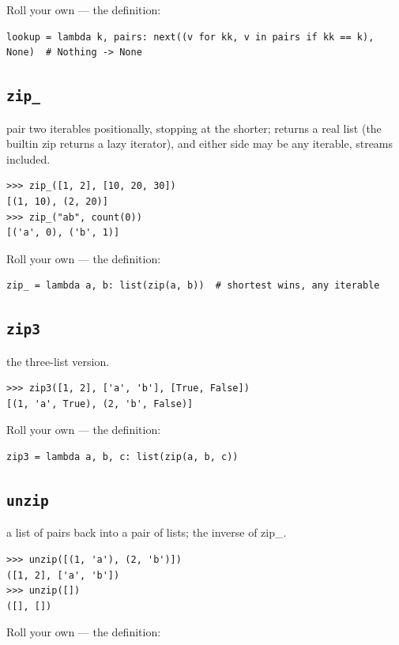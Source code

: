\documentclass[10pt,letterpaper]{book}
\begin{document}
Roll your own --- the definition:

\begin{lstlisting}[style=ex]
lookup = lambda k, pairs: next((v for kk, v in pairs if kk == k), None)  # Nothing -> None
\end{lstlisting}
\subsection{\texttt{zip\_}}\label{def:zip-}
pair two iterables positionally, stopping at the shorter; returns a real list (the builtin zip returns a lazy iterator), and either side may be any iterable, streams included.
\begin{lstlisting}[style=ex]
>>> zip_([1, 2], [10, 20, 30])
[(1, 10), (2, 20)]
>>> zip_("ab", count(0))
[('a', 0), ('b', 1)]
\end{lstlisting}

Roll your own --- the definition:

\begin{lstlisting}[style=ex]
zip_ = lambda a, b: list(zip(a, b))  # shortest wins, any iterable
\end{lstlisting}

\subsection{\texttt{zip3}}\label{def:zip3}
the three-list version.
\begin{lstlisting}[style=ex]
>>> zip3([1, 2], ['a', 'b'], [True, False])
[(1, 'a', True), (2, 'b', False)]
\end{lstlisting}

Roll your own --- the definition:

\begin{lstlisting}[style=ex]
zip3 = lambda a, b, c: list(zip(a, b, c))
\end{lstlisting}
\subsection{\texttt{unzip}}\label{def:unzip}
a list of pairs back into a pair of lists; the inverse of zip\_.
\begin{lstlisting}[style=ex]
>>> unzip([(1, 'a'), (2, 'b')])
([1, 2], ['a', 'b'])
>>> unzip([])
([], [])
\end{lstlisting}

Roll your own --- the definition:
\end{document}
